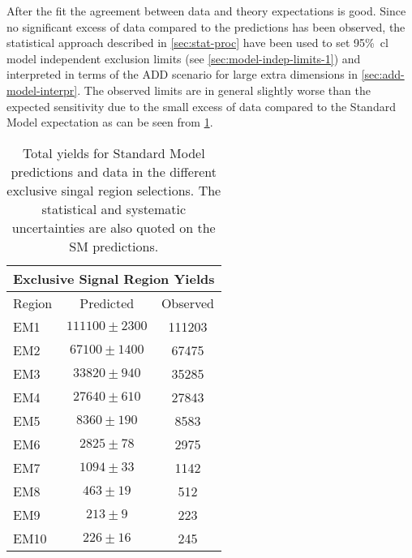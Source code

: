 After the fit the agreement between data and theory expectations is
good. Since no significant excess of data compared to the predictions has been
observed, the statistical approach described in \cref{sec:stat-proc} have been
used to set 95\%~\gls{cl} model independent exclusion limits (see
\cref{sec:model-indep-limits-1}) and interpreted in terms of the ADD scenario
for large extra dimensions in \cref{sec:add-model-interpr}. The observed limits
are in general slightly worse than the expected sensitivity due to the small
excess of data compared to the Standard Model expectation as can be seen from
\cref{tab:sr_yields}.
\begin{table}[!h]
  \centering
  \begin{tabular}{lcc}
    \toprule
    \multicolumn{3}{c}{Exclusive Signal Region Yields} \\
    \midrule \midrule
    Region & Predicted & Observed \\
    \midrule
    EM1 & $111100 \pm 2300$ & 111203 \\
    EM2 & $67100 \pm 1400$ & 67475 \\
    EM3 & $33820 \pm 940$ & 35285 \\
    EM4 & $27640 \pm 610$ & 27843 \\
    EM5 & $8360 \pm 190$ & 8583 \\
    EM6 & $2825 \pm 78$ & 2975 \\
    EM7 & $1094 \pm 33$ & 1142 \\
    EM8 & $463 \pm 19$ & 512 \\
    EM9 & $213 \pm 9$ & 223 \\
    EM10 & $226 \pm 16$ & 245 \\
    \bottomrule
  \end{tabular}
  \caption{Total yields for Standard Model predictions and data in the different
    exclusive singal region selections. The statistical and systematic
    uncertainties are also quoted on the SM predictions.}
  \label{tab:sr_yields}
\end{table}
